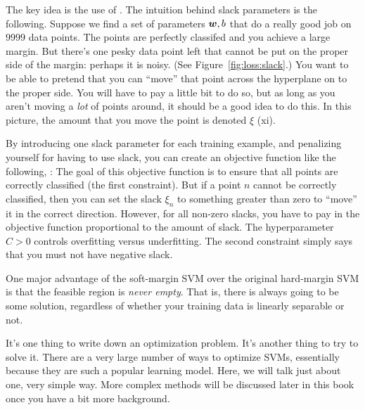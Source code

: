 The key idea is the use of .  The intuition
behind slack parameters is the following.  Suppose we find a set of
parameters ${\boldsymbol{w}},b$ that do a really good job on $9999$ data points.
The points are perfectly classifed and you achieve a large margin.
But there's one pesky data point left that cannot be put on the proper
side of the margin: perhaps it is noisy.  (See
Figure~\ref{fig:loss:slack}.)  You want to be able to pretend that you
can ``move'' that point across the hyperplane on to the proper side.
You will have to pay a little bit to do so, but as long as you aren't
moving a \emph{lot} of points around, it should be a good idea to do
this.  In this picture, the amount that you move the point is denoted
$\xi$ (xi).

By introducing one slack parameter for each training example, and
penalizing yourself for having to use slack, you can create an
objective function like the following, :
%
%
The goal of this objective function is to ensure that all points are
correctly classified (the first constraint).  But if a point $n$
cannot be correctly classified, then you can set the slack $\xi_n$ to
something greater than zero to ``move'' it in the correct direction.
However, for all non-zero slacks, you have to pay in the objective
function proportional to the amount of slack.  The hyperparameter
$C>0$ controls overfitting versus underfitting.  The second constraint
simply says that you must not have negative slack.


One major advantage of the soft-margin SVM over the original
hard-margin SVM is that the feasible region is \emph{never empty}.
That is, there is always going to be some solution, regardless of
whether your training data is linearly separable or not.


It's one thing to write down an optimization problem.  It's another
thing to try to solve it.  There are a very large number of ways to
optimize SVMs, essentially because they are such a popular learning
model.  Here, we will talk just about one, very simple way.  More
complex methods will be discussed later in this book once you have a
bit more background.

